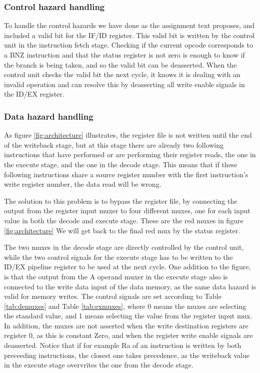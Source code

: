 \documentclass[11pt]{report}
\begin{document}
\subsubsection*{Control hazard handling}

To handle the control hazards we have done as the assignment text proposes, and included
a valid bit for the IF/ID register. This valid bit is written by the control unit in the
instruction fetch stage. Checking if the current opcode 
corresponds to a BNZ instruction and that the status register is not zero
is enough to know if the branch is being taken, and so the valid bit can be deasserted. 
When the control unit checks the valid bit the next cycle, it knows it is dealing with an 
invalid operation and can resolve this by deasserting all write enable signals in the 
ID/EX register.

\subsubsection*{Data hazard handling}

As figure \ref{fig:architecture}
illustrates, the register file is not written until the end of the 
writeback stage, but at this stage there are already two following instructions that
have performed or are performing their register reads, the one in the execute stage, 
and the one in the 
decode stage. This means that if these following instructions share a source register
number with the first instruction's write register number, the data read will be wrong. 

The solution to this problem is to bypass the register file, by connecting the output
from the register input muxer to four different muxes, one for each input value in both
the decode and execute stage. These are the red muxes in figure \ref{fig:architecture}
We will get back to the final red mux by the status register. 

The two muxes in the
decode stage are directly controlled by the control unit, while the two control signals 
for the execute stage has to be written to the ID/EX pipeline register to be used at the
next cycle. One addition to the figure, is that the output from the A operand muxer in 
the execute stage also is connected to the write data input of the data memory, as the
same data hazard is valid for memory writes. The control signals are set according to
Table \ref{tab:demuxes} and Table \ref{tab:exmuxes}, 
where 0 means the muxes are selecting the standard value, and 1 means selecting the 
value from the register input mux. In addition, the muxes are not asserted when 
the write destination registers are register 0, 
as this is constant Zero, and when the register write enable signals are deasserted.
Notice that if for example Ra of an instruction is written by both preceeding 
instructions, the closest one takes precedence, as the writeback value in the
execute stage overvrites the one from the decode stage.
\end{document}

